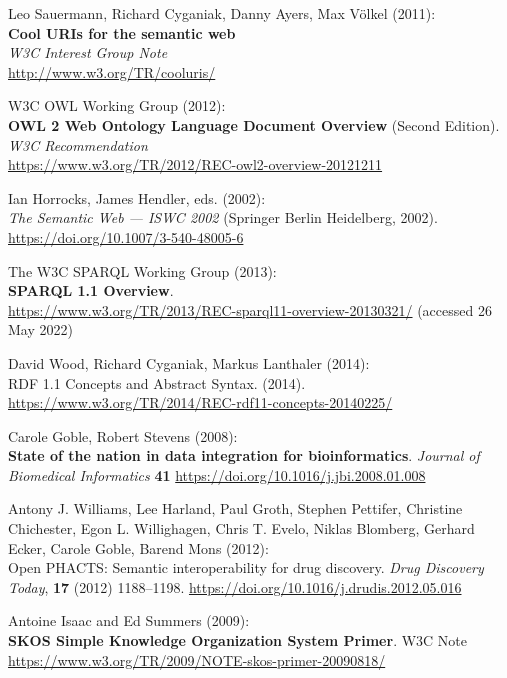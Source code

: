 \begin{thebibliography}{9}
Leo Sauermann, Richard Cyganiak, Danny Ayers, Max Völkel (2011): \\
\textbf{Cool URIs for the semantic web}\\
\emph{W3C Interest Group Note}\\
\url{http://www.w3.org/TR/cooluris/}


W3C OWL Working Group (2012): \\
\textbf{{OWL} 2 {Web Ontology Language Document Overview}} ({Second Edition}). \\
\emph{W3C Recommendation} \\
\url{https://www.w3.org/TR/2012/REC-owl2-overview-20121211} 

Ian Horrocks, James Hendler, eds. (2002): \\
\emph{The {Semantic Web} ---
{ISWC} 2002} ({Springer Berlin Heidelberg}, 2002).
\url{https://doi.org/10.1007/3-540-48005-6}

The W3C SPARQL Working Group (2013):\\
\textbf{{SPARQL} 1.1 {Overview}}. \\
\url{https://www.w3.org/TR/2013/REC-sparql11-overview-20130321/} (accessed 26 May 2022)

David Wood, Richard Cyganiak, Markus Lanthaler (2014): \\
{RDF 1.1
Concepts and Abstract Syntax}. (2014).
\url{https://www.w3.org/TR/2014/REC-rdf11-concepts-20140225/}

Carole Goble, Robert Stevens (2008): \\
\textbf{State of the nation in data integration for bioinformatics}.
\emph{Journal of Biomedical Informatics} \textbf{41}
\url{https://doi.org/10.1016/j.jbi.2008.01.008}

Antony J. Williams, Lee Harland, Paul Groth, Stephen Pettifer, Christine
Chichester, Egon L. Willighagen, Chris T. Evelo, Niklas Blomberg,
Gerhard Ecker, Carole Goble, Barend Mons (2012): \\
Open {PHACTS}:
Semantic interoperability for drug discovery. \emph{Drug Discovery
Today}, \textbf{17} (2012) 1188--1198.
\url{https://doi.org/10.1016/j.drudis.2012.05.016}

Antoine Isaac and Ed Summers (2009): \\
\textbf{SKOS Simple Knowledge Organization System Primer}. 
W3C Note 
\url{https://www.w3.org/TR/2009/NOTE-skos-primer-20090818/}


\end{thebibliography}

